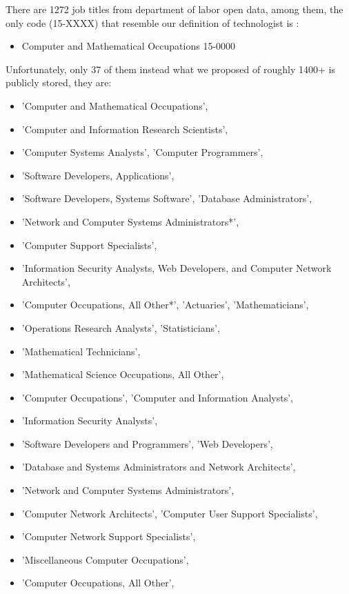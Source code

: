 There are 1272 job titles from department of labor open data, among  them, the only code (15-XXXX) that resemble our definition of technologist  is : 
\begin{itemize}
	\item Computer and Mathematical Occupations 15-0000
\end{itemize}
Unfortunately, only 37 of them instead  what we proposed of roughly 1400+ is publicly stored, they are:\\
{ \small
	\begin{itemize}
		\item 'Computer and Mathematical Occupations',
		\item	'Computer and Information Research Scientists',
		\item	'Computer Systems Analysts', 'Computer Programmers',
		\item	'Software Developers, Applications',
		\item	'Software Developers, Systems Software', 'Database Administrators',
		\item	'Network and Computer Systems Administrators*',
		\item	'Computer Support Specialists',
		\item	'Information Security Analysts, Web Developers, and Computer Network Architects',
		\item	'Computer Occupations, All Other*', 'Actuaries', 'Mathematicians',
		\item	'Operations Research Analysts', 'Statisticians',
		\item	'Mathematical Technicians',
		\item	'Mathematical Science Occupations, All Other',
		\item	'Computer Occupations', 'Computer and Information Analysts',
		\item	'Information Security Analysts',
		\item	'Software Developers and Programmers', 'Web Developers',
		\item	'Database and Systems Administrators and Network Architects',
		\item	'Network and Computer Systems Administrators',
		\item	'Computer Network Architects', 'Computer User Support Specialists',
		\item	'Computer Network Support Specialists',
		\item	'Miscellaneous Computer Occupations',
		\item	'Computer Occupations, All Other',

\end{itemize}}
